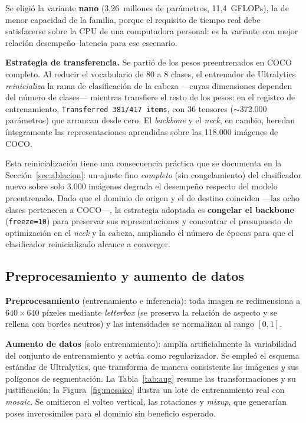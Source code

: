 \documentclass[11pt,a4paper]{article}
\begin{document}
Se eligió la variante \textbf{nano} (3,26~millones de parámetros,
11,4~GFLOPs), la de menor capacidad de la familia, porque el requisito de
tiempo real debe satisfacerse sobre la CPU de una computadora personal: es la
variante con mejor relación desempeño--latencia para ese escenario.

\textbf{Estrategia de transferencia.} Se partió de los pesos preentrenados en
COCO completo. Al reducir el vocabulario de 80 a 8 clases, el entrenador de
Ultralytics \emph{reinicializa} la rama de clasificación de la cabeza ---cuyas
dimensiones dependen del número de clases--- mientras transfiere el resto de los
pesos: en el registro de entrenamiento, \texttt{Transferred 381/417 items}, con
36 tensores ($\sim$372.000 parámetros) que arrancan desde cero. El
\emph{backbone} y el \emph{neck}, en cambio, heredan íntegramente las
representaciones aprendidas sobre las 118.000 imágenes de COCO.

Esta reinicialización tiene una consecuencia práctica que se documenta en la
Sección~\ref{sec:ablacion}: un ajuste fino \emph{completo} (sin congelamiento)
del clasificador nuevo sobre solo 3.000 imágenes degrada el desempeño respecto
del modelo preentrenado. Dado que el dominio de origen y el de destino coinciden
---las ocho clases pertenecen a COCO---, la estrategia adoptada es
\textbf{congelar el backbone} (\texttt{freeze=10}) para preservar sus
representaciones y concentrar el presupuesto de optimización en el \emph{neck} y
la cabeza, ampliando el número de épocas para que el clasificador reinicializado
alcance a converger.

\subsection{Preprocesamiento y aumento de datos}

\textbf{Preprocesamiento} (entrenamiento e inferencia): toda imagen se
redimensiona a $640\times640$ píxeles mediante \emph{letterbox} (se preserva
la relación de aspecto y se rellena con bordes neutros) y las intensidades se
normalizan al rango $[0,1]$.

\textbf{Aumento de datos} (solo entrenamiento): amplía artificialmente la
variabilidad del conjunto de entrenamiento y actúa como regularizador. Se
empleó el esquema estándar de Ultralytics, que transforma de manera
consistente las imágenes \emph{y} sus polígonos de segmentación. La
Tabla~\ref{tab:aug} resume las transformaciones y su justificación; la
Figura~\ref{fig:mosaico} ilustra un lote de entrenamiento real con
\emph{mosaic}. Se omitieron el volteo vertical, las rotaciones y
\emph{mixup}, que generarían poses inverosímiles para el dominio sin
beneficio esperado.
\end{document}
